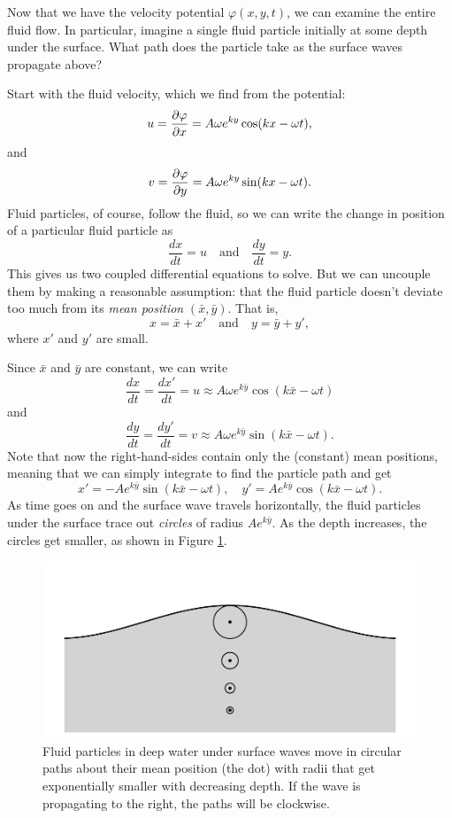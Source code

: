 \begin{example}

Now that we have the velocity potential $\varphi(x, y, t)$, we can examine the entire fluid flow.  In particular, imagine a single fluid particle initially at some depth under the surface.  What path does the particle take as the surface waves propagate above?

Start with the fluid velocity, which we find from the potential:
\[
u = \frac{\partial {\varphi}}{\partial {x}} = A \omega e^{ky} \cos (kx - \omega t),
\]
and
\[
v = \frac{\partial {\varphi}}{\partial {y}} = A \omega e^{ky} \sin (kx - \omega t).
\]
Fluid particles, of course, follow the fluid, so we can write the change in position of a particular fluid particle as
\[
\frac{dx}{dt} = u \quad \text{and} \quad \frac{dy}{dt} = y.
\]
This gives us two coupled differential equations to solve.  But we can uncouple them by making a reasonable assumption:  that the fluid particle doesn't deviate too much from its \emph{mean position} $(\bar{x}, \bar{y})$.  That is, 
\[
x = \bar{x} + x'  \quad \text{and} \quad y = \bar{y} + y',
\]
where $x'$ and $y'$ are small.

Since $\bar{x}$ and $\bar{y}$ are constant, we can write
\[
\frac{dx}{dt} = \frac{dx'}{dt} = u \approx A \omega e^{k\bar{y}} \cos (k \bar{x} - \omega t)
\]
and 
\[
\frac{dy}{dt} = \frac{dy'}{dt} = v \approx A \omega e^{k\bar{y}} \sin (k \bar{x} - \omega t).
\]
Note that now the right-hand-sides contain only the (constant) mean positions, meaning that we can simply integrate to find the particle path and get
\begin{equation}
x' = -A e^{k\bar{y}} \sin(k\bar{x} - \omega t), \quad  y' = A e^{k\bar{y}} \cos (k\bar{x} - \omega t).
\end{equation}
As time goes on and the surface wave travels horizontally, the fluid particles under the surface trace out \emph{circles} of radius $Ae^{k\bar{y}}$.  As the depth increases, the circles get smaller, as shown in Figure \ref{fig_circle_paths}.

\end{example}


\begin{figure}
\centering\includegraphics[width=0.8\linewidth]{Figures/Chapter5/fig_circle_paths}
\caption{Fluid particles in deep water under surface waves move in circular paths about their mean position (the dot) with radii that get exponentially smaller with decreasing depth.  If the wave is propagating to the right, the paths will be clockwise.}
\label{fig_circle_paths}
\end{figure}

